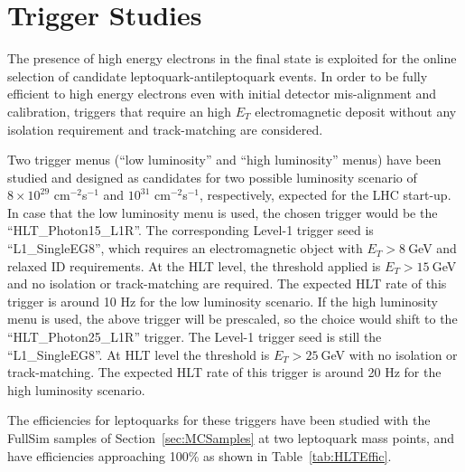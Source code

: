 %
\section{Trigger Studies} \label{sec:trig}

The presence of high energy electrons in the final state is exploited for the online selection 
of candidate leptoquark-antileptoquark events.
In order to be fully efficient to high energy electrons even with initial detector mis-alignment 
and calibration, triggers that require an high $E_T$ electromagnetic deposit without any isolation 
requirement and track-matching are considered.

Two trigger menus  (``low luminosity'' and ``high luminosity'' menus) 
have been studied and designed as candidates for 
two possible luminosity scenario of $8\times10^{29}$ cm$^{-2}$s$^{-1}$ and $10^{31}$ cm$^{-2}$s$^{-1}$,
respectively, expected for the LHC start-up.
In case that the low luminosity menu is used, the chosen trigger would be the ``HLT\_Photon15\_L1R''.
The corresponding Level-1 trigger seed is ``L1\_SingleEG8'', which requires an electromagnetic object with 
$E_T>8~$GeV and relaxed ID requirements. 
At the HLT level, the threshold applied is $E_T>15~$GeV and no isolation or track-matching
are required. The expected HLT rate of this trigger is around 10 Hz for the low luminosity scenario.
If the high luminosity menu is used, the above trigger will be prescaled, so the choice would shift to the
``HLT\_Photon25\_L1R'' trigger. The Level-1 trigger seed is still the ``L1\_SingleEG8''. At HLT level the 
threshold is $E_T>25~$GeV with no isolation or track-matching. 
The expected HLT rate of this trigger is around 20 Hz for the high luminosity scenario.

The efficiencies for leptoquarks for these triggers have been studied with the FullSim 
samples of Section~\ref{sec:MCSamples} at two leptoquark mass points, and have efficiencies approaching
100\% as shown in Table~\ref{tab:HLTEffic}.


